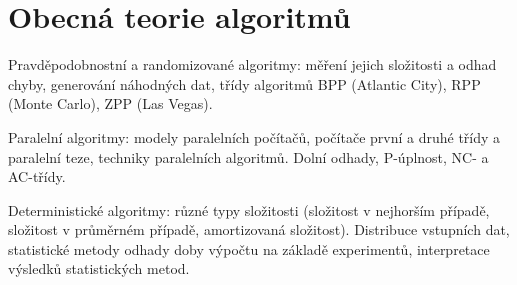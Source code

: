 \newpage
\section{Obecná teorie algoritmů}
\begin{pozadavky}
\begin{pitemize}
\item Pravděpodobnostní a randomizované algoritmy: měření jejich složitosti a odhad chyby, generování náhodných dat, třídy algoritmů BPP (Atlantic City), RPP (Monte Carlo), ZPP (Las Vegas).
\item Paralelní algoritmy: modely paralelních počítačů, počítače první a druhé třídy a paralelní teze, techniky paralelních algoritmů. Dolní odhady, P-úplnost, NC- a AC-třídy.
\item Deterministické algoritmy: různé typy složitosti (složitost v nejhorším případě, složitost v průměrném případě, amortizovaná složitost). Distribuce vstupních dat, statistické metody odhady doby výpočtu na základě experimentů, interpretace výsledků statistických metod.
\end{pitemize}
\end{pozadavky}